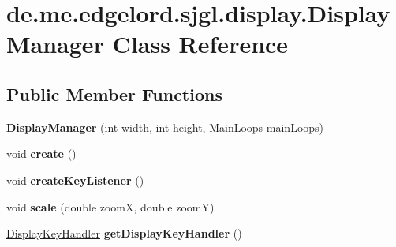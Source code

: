 \hypertarget{classde_1_1me_1_1edgelord_1_1sjgl_1_1display_1_1_display_manager}{}\section{de.\+me.\+edgelord.\+sjgl.\+display.\+Display\+Manager Class Reference}
\label{classde_1_1me_1_1edgelord_1_1sjgl_1_1display_1_1_display_manager}
\subsection*{Public Member Functions}
\begin{DoxyCompactItemize}
\item 
\mbox{\label{classde_1_1me_1_1edgelord_1_1sjgl_1_1display_1_1_display_manager_ab6222b856dc0a49a9395b8171763d40f}} 
{\bfseries Display\+Manager} (int width, int height, \mbox{\hyperlink{classde_1_1me_1_1edgelord_1_1sjgl_1_1core_1_1_main_loops}{Main\+Loops}} main\+Loops)
\item 
\mbox{\label{classde_1_1me_1_1edgelord_1_1sjgl_1_1display_1_1_display_manager_a66a3da380f0f04b4dcd285a58f1a9511}} 
void {\bfseries create} ()
\item 
\mbox{\label{classde_1_1me_1_1edgelord_1_1sjgl_1_1display_1_1_display_manager_ae772cc4cf0146ab27c6275b04d24a1ca}} 
void {\bfseries create\+Key\+Listener} ()
\item 
\mbox{\label{classde_1_1me_1_1edgelord_1_1sjgl_1_1display_1_1_display_manager_acf9d32580498ad0cf4129e10f4e5132f}} 
void {\bfseries scale} (double zoomX, double zoomY)
\item 
\mbox{\label{classde_1_1me_1_1edgelord_1_1sjgl_1_1display_1_1_display_manager_a3924227368b9d9343aa7bd77ab89b375}} 
\mbox{\hyperlink{interfacede_1_1me_1_1edgelord_1_1sjgl_1_1input_1_1_display_key_handler}{Display\+Key\+Handler}} {\bfseries get\+Display\+Key\+Handler} ()
\item 

\end{DoxyCompactItemize}

